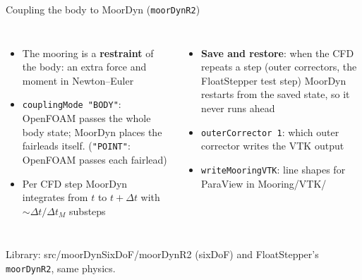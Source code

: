 \documentclass[aspectratio=169,10pt]{beamer}
\newcommand{\file}[1]{{\leavevmode\ttfamily\color{deep}#1}}
\begin{document}
\begin{frame}{Coupling the body to MoorDyn (\texttt{moorDynR2})}
  \centering

  \vspace{4mm}
  \begin{columns}[T]
    \small
    \begin{itemize}
      \item The mooring is a \textbf{restraint} of the body: an extra force and moment in Newton--Euler
      \item \texttt{couplingMode "BODY"}: OpenFOAM passes the whole body state; MoorDyn places the
            fairleads itself. (\texttt{"POINT"}: OpenFOAM passes each fairlead)
      \item Per CFD step MoorDyn integrates from $t$ to $t+\Delta t$ with $\sim\Delta t/\Delta t_M$ substeps
    \end{itemize}
    \small
    \begin{itemize}
      \item \textbf{Save and restore}: when the CFD repeats a step (outer correctors, the FloatStepper
            test step) MoorDyn restarts from the saved state, so it never runs ahead
      \item \texttt{outerCorrector 1}: which outer corrector writes the VTK output
      \item \texttt{writeMooringVTK}: line shapes for ParaView in \file{Mooring/VTK/}
    \end{itemize}
  \end{columns}

  \vspace{2mm}
  \small Library: \file{src/moorDynSixDoF/moorDynR2} (sixDoF) and FloatStepper's \texttt{moorDynR2}, same physics.
\end{frame}
\end{document}
